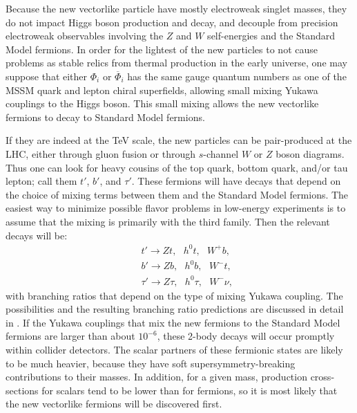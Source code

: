 \documentclass[11pt]{article}
\def\beq{\begin{eqnarray}}
\def\eeq{\end{eqnarray}}
\begin{document}
Because the new vectorlike particle have mostly electroweak singlet 
masses, they do not impact Higgs boson production and decay, and 
decouple from precision electroweak observables involving the $Z$ and 
$W$ self-energies and the Standard Model fermions.  In order for the 
lightest of the new particles to not cause problems as stable relics 
from thermal production in the early universe, one may suppose that 
either $\Phi_i$ or $\overline \Phi_i$ has the same gauge quantum numbers 
as one of the MSSM quark and lepton chiral superfields, allowing small 
mixing Yukawa couplings to the Higgs boson. This small mixing allows the 
new vectorlike fermions to decay to Standard Model fermions.

If they are indeed at the TeV scale, the new particles can be 
pair-produced at the LHC, either through gluon fusion or through 
$s$-channel $W$ or $Z$ boson diagrams. Thus one can look for heavy 
cousins of the top quark, bottom quark, and/or tau lepton; call them 
$t'$, $b'$, and $\tau'$. These fermions will have decays that depend on 
the choice of mixing terms between them and the Standard Model fermions. 
The easiest way to minimize possible flavor problems in low-energy 
experiments is to assume that the mixing is primarily with the third 
family. Then the relevant decays will be:
\beq
&&t' \rightarrow Zt,\>\>\>h^0 t,\>\>\> W^+b,
\\
&&b' \rightarrow Zb,\>\>\>h^0 b,\>\>\> W^-t,
\\
&&\tau' \rightarrow Z\tau,\>\>\>h^0 \tau,\>\>\> W^-\nu,
\eeq
with branching ratios that depend on the type of mixing Yukawa coupling. 
The possibilities and the resulting branching ratio predictions
are discussed in detail in \cite{Martin:2009bg}. 
If the Yukawa couplings that mix the
new fermions to the Standard Model fermions are larger than about $10^{-6}$, these
2-body decays will occur promptly within collider detectors. The scalar partners
of these fermionic states are likely to be much heavier, because they have soft 
supersymmetry-breaking contributions to their masses. In addition, for a given
mass, production 
cross-sections for scalars tend to be lower than for fermions, so it is 
most likely that the new vectorlike fermions will be discovered first.
\end{document}
